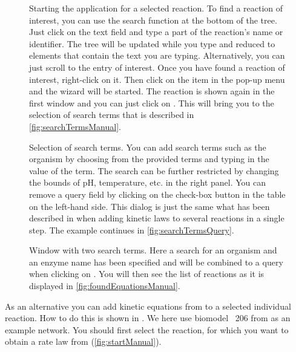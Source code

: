 \begin{figure}[t!]
\caption[Starting the \SABIO application for a selected reaction]{Starting the \SABIO application for a selected reaction.
To find a reaction of interest, you can use the search function at the bottom of the \SBML tree.
Just click on the text field and type a part of the reaction's name or identifier.
The tree will be updated while you type and reduced to elements that contain the text you are typing.
Alternatively, you can just scroll to the entry of interest.
Once you have found a reaction of interest, right-click on it.
Then click on the \SABIO item in the pop-up menu and the \SABIO wizard will be started.
The reaction is shown again in the first window and you can just click on .
This will bring you to the selection of search terms that is described in \vref{fig:searchTermsManual}.}
\label{fig:startManual}
\end{figure}
\begin{figure}
\caption[Selection of search terms]{Selection of search terms.
You can add search terms such as the organism by choosing from the provided terms and
typing in the value of the term. The search can be further restricted by changing the
bounds of pH, temperature, etc. in the right panel. 
You can remove a query field by clicking on the check-box button in the table on the left-hand side.
This dialog is just the same what has been described in  when adding kinetic laws to several reactions in a single step.
The example continues in \vref{fig:searchTermsQuery}.}
\label{fig:searchTermsManual}
\end{figure}
\begin{figure}
\caption[Window with two search terms]{Window with two search terms.
Here a search for an organism and an enzyme name has been specified and will be
combined to a query when clicking on .
You will then see the list of reactions as it is displayed in \vref{fig:foundEquationsManual}.}
\label{fig:searchTermsQuery}
\end{figure}
As an alternative you can add kinetic equations from \SABIO to a selected individual reaction.
How to do this is shown in .
We here use biomodel \numero~206 from \BioModels \citep{Li2010a, Wolf2000} as an example network.
You should first select the reaction, for which you want to obtain a rate law from \SABIO (\vref{fig:startManual}).
